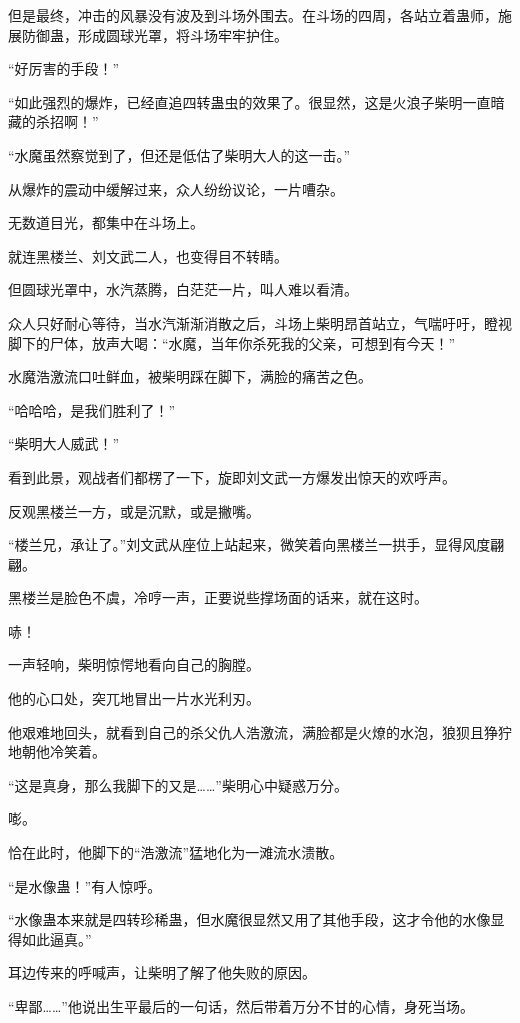 \begin{this_body}
但是最终，冲击的风暴没有波及到斗场外围去。在斗场的四周，各站立着蛊师，施展防御蛊，形成圆球光罩，将斗场牢牢护住。

“好厉害的手段！”

“如此强烈的爆炸，已经直追四转蛊虫的效果了。很显然，这是火浪子柴明一直暗藏的杀招啊！”

“水魔虽然察觉到了，但还是低估了柴明大人的这一击。”

从爆炸的震动中缓解过来，众人纷纷议论，一片嘈杂。

无数道目光，都集中在斗场上。

就连黑楼兰、刘文武二人，也变得目不转睛。

但圆球光罩中，水汽蒸腾，白茫茫一片，叫人难以看清。

众人只好耐心等待，当水汽渐渐消散之后，斗场上柴明昂首站立，气喘吁吁，瞪视脚下的尸体，放声大喝：“水魔，当年你杀死我的父亲，可想到有今天！”

水魔浩激流口吐鲜血，被柴明踩在脚下，满脸的痛苦之色。

“哈哈哈，是我们胜利了！”

“柴明大人威武！”

看到此景，观战者们都楞了一下，旋即刘文武一方爆发出惊天的欢呼声。

反观黑楼兰一方，或是沉默，或是撇嘴。

“楼兰兄，承让了。”刘文武从座位上站起来，微笑着向黑楼兰一拱手，显得风度翩翩。

黑楼兰是脸色不虞，冷哼一声，正要说些撑场面的话来，就在这时。

哧！

一声轻响，柴明惊愕地看向自己的胸膛。

他的心口处，突兀地冒出一片水光利刃。

他艰难地回头，就看到自己的杀父仇人浩激流，满脸都是火燎的水泡，狼狈且狰狞地朝他冷笑着。

“这是真身，那么我脚下的又是……”柴明心中疑惑万分。

嘭。

恰在此时，他脚下的“浩激流”猛地化为一滩流水溃散。

“是水像蛊！”有人惊呼。

“水像蛊本来就是四转珍稀蛊，但水魔很显然又用了其他手段，这才令他的水像显得如此逼真。”

耳边传来的呼喊声，让柴明了解了他失败的原因。

“卑鄙……”他说出生平最后的一句话，然后带着万分不甘的心情，身死当场。


\end{this_body}
